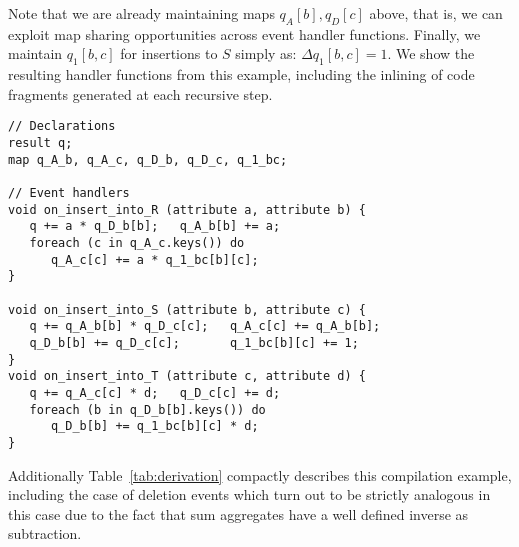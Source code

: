 \noindent Note that we are already maintaining maps $q_A[b], q_D[c]$ above, that
is, we can exploit map sharing opportunities across event handler functions.
Finally, we maintain $q_1[b,c]$ for insertions to $S$ simply as:
$\Delta q_1[b,c] = 1$. We show the resulting handler functions from this example,
including the inlining of code fragments generated at each recursive step.

\vspace{-1mm}
\begin{verbatim}
// Declarations
result q;
map q_A_b, q_A_c, q_D_b, q_D_c, q_1_bc;

// Event handlers
void on_insert_into_R (attribute a, attribute b) {
   q += a * q_D_b[b];   q_A_b[b] += a;
   foreach (c in q_A_c.keys()) do
      q_A_c[c] += a * q_1_bc[b][c];
}

void on_insert_into_S (attribute b, attribute c) {
   q += q_A_b[b] * q_D_c[c];   q_A_c[c] += q_A_b[b];
   q_D_b[b] += q_D_c[c];       q_1_bc[b][c] += 1;
}
void on_insert_into_T (attribute c, attribute d) {
   q += q_A_c[c] * d;   q_D_c[c] += d;
   foreach (b in q_D_b[b].keys()) do
      q_D_b[b] += q_1_bc[b][c] * d;
}
\end{verbatim}
\vspace{-1mm}

Additionally Table~\ref{tab:derivation} compactly describes this compilation
example, including the case of deletion events which turn out to be strictly analogous in
this case due to the fact that sum aggregates have a well defined inverse as
subtraction.


